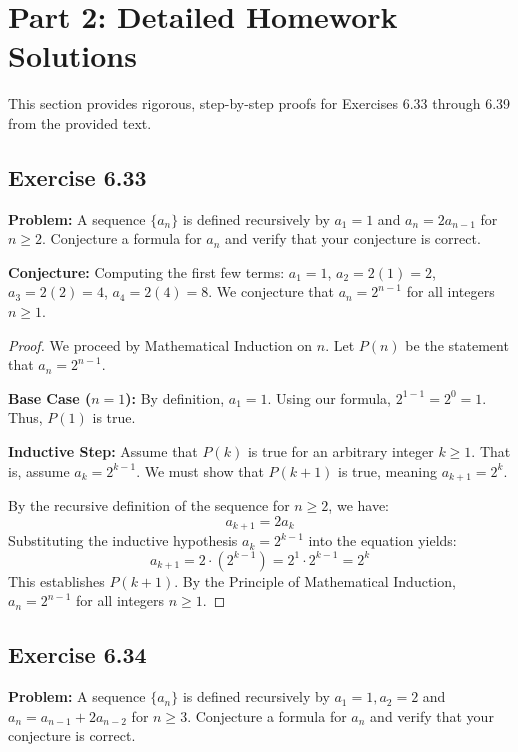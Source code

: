 \documentclass[11pt, a4paper]{article}
\theoremstyle{definition}
\theoremstyle{remark}
\begin{document}
\section{Part 2: Detailed Homework Solutions}

This section provides rigorous, step-by-step proofs for Exercises 6.33 through 6.39 from the provided text.

\subsection{Exercise 6.33}
\textbf{Problem:} A sequence $\{a_n\}$ is defined recursively by $a_1 = 1$ and $a_n = 2a_{n-1}$ for $n \ge 2$. Conjecture a formula for $a_n$ and verify that your conjecture is correct.

\textbf{Conjecture:} 
Computing the first few terms: $a_1 = 1$, $a_2 = 2(1) = 2$, $a_3 = 2(2) = 4$, $a_4 = 2(4) = 8$. 
We conjecture that $a_n = 2^{n-1}$ for all integers $n \ge 1$.

\begin{proof}
    We proceed by Mathematical Induction on $n$. Let $P(n)$ be the statement that $a_n = 2^{n-1}$.
    
    \textbf{Base Case ($n=1$):} 
    By definition, $a_1 = 1$. Using our formula, $2^{1-1} = 2^0 = 1$. Thus, $P(1)$ is true.
    
    \textbf{Inductive Step:} 
    Assume that $P(k)$ is true for an arbitrary integer $k \ge 1$. That is, assume $a_k = 2^{k-1}$. We must show that $P(k+1)$ is true, meaning $a_{k+1} = 2^k$.
    
    By the recursive definition of the sequence for $n \ge 2$, we have:
    \[ a_{k+1} = 2a_k \]
    Substituting the inductive hypothesis $a_k = 2^{k-1}$ into the equation yields:
    \[ a_{k+1} = 2 \cdot (2^{k-1}) = 2^1 \cdot 2^{k-1} = 2^k \]
    This establishes $P(k+1)$. By the Principle of Mathematical Induction, $a_n = 2^{n-1}$ for all integers $n \ge 1$.
\end{proof}

\subsection{Exercise 6.34}
\textbf{Problem:} A sequence $\{a_n\}$ is defined recursively by $a_1 = 1, a_2 = 2$ and $a_n = a_{n-1} + 2a_{n-2}$ for $n \ge 3$. Conjecture a formula for $a_n$ and verify that your conjecture is correct.
\end{document}
